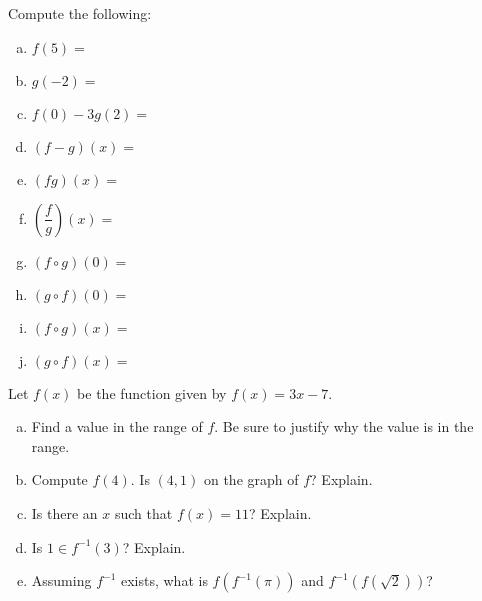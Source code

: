 \documentclass[11pt,letterpaper]{article}
\begin{document}
Compute the following: \pspace
\begin{enumerate}[(a)]
\item $f(5)=$ \vfill
\item $g(-2)=$ \vfill
\item $f(0) - 3g(2)=$ \vfill
\item $(f - g)(x)=$ \vfill
\item $(fg)(x)=$ \vfill
\item $\left( \dfrac{f}{g} \right)(x)=$ \vfill
\item $(f \circ g)(0)=$ \vfill
\item $(g \circ f)(0)=$ \vfill
\item $(f \circ g)(x)=$ \vfill
\item $(g \circ f)(x)=$ \vfill
\end{enumerate} 



\newpage



 Let $f(x)$ be the function given by $f(x)= 3x - 7$. 
	\begin{enumerate}[(a)]
	\item Find a value in the range of $f$. Be sure to justify why the value is in the range. 
	\item Compute $f(4)$. Is $(4, 1)$ on the graph of $f$? Explain. 
	\item Is there an $x$ such that $f(x)= 11$? Explain. 
	\item Is $1 \in f^{-1}(3)$? Explain. 
	\item Assuming $f^{-1}$ exists, what is $f(f^{-1}(\pi))$ and $f^{-1}(f(\sqrt{2}))$?
	\end{enumerate}
\end{document}
